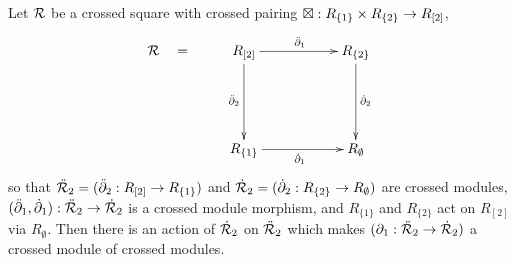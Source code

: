 \begin{thm}  \label{thm:xxmod-from-square}
Let  $\mathcal{R}$  be a crossed square with crossed pairing
\;$\boxtimes : R_{\{1\}} \times R_{\{2\}} \to R_{[2]}$, 
$$
\xymatrix{
\calR \quad = 
  & R_{[2]} \ar[rr]^{\ddbdyo} \ar[dd]_{\ddbdyt}
     && R_{\{2\}} \ar[dd]^{\dbdyt}  \\
  &  &&  \\
  & R_{\{1\}} \ar[rr]_{\dbdyo}
     && R_{\emptyset}
}
$$
so that
$\ddot{\mathcal{R}}_2 = (\ddot{\partial}_2: R_{[2]} \to R_{\{1\}})$ and 
$\dot{\mathcal{R}}_2 = (\dot{\partial}_2:R_{\{2\}} \to R_{\emptyset})$  are crossed modules, 
$(\ddot{\partial}_1, \dot{\partial}_1): \ddot{\mathcal{R}}_2 \to \dot{\mathcal{R}}_2$  is a crossed module morphism, 
and  $R_{\{1\}}$ and $R_{\{2\}}$ act on $R_{[2]}$ via $R_{\emptyset}$. 
Then there is an action of  $\dot{\mathcal{R}}_2$ on $\ddot{\mathcal{R}}_2$ which makes 
$(\partial_1 : \ddot{\mathcal{R}}_2 \to \dot{\mathcal{R}}_2)$ a crossed module of crossed modules.
\end{thm}
